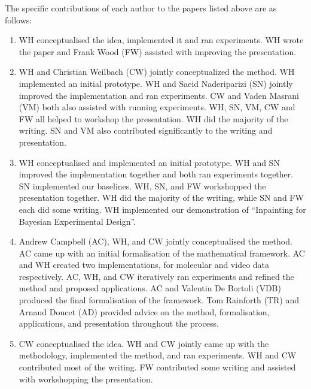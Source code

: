 
The specific contributions of each author to the papers listed above are as follows:
\begin{enumerate}
    \item WH conceptualised the idea, implemented it and ran experiments. WH wrote the paper and Frank Wood (FW) assisted with improving the presentation.
    \item WH and Christian Weilbach (CW) jointly conceptualized the method. WH implemented an initial prototype. WH and Saeid Naderiparizi (SN) jointly improved the implementation and ran experiments. CW and Vaden Masrani (VM) both also assisted with running experiments. WH, SN, VM, CW and FW all helped to workshop the presentation. WH did the majority of the writing. SN and VM also contributed significantly to the writing and presentation.
    \item WH conceptualised and implemented an initial prototype. WH and SN improved the implementation together and both ran experiments together.  SN implemented our baselines. WH, SN, and FW workshopped the presentation together. WH did the majority of the writing, while SN and FW each did some writing. WH implemented our demonstration of ``Inpainting for Bayesian Experimental Design''.
    \item Andrew Campbell (AC), WH, and CW jointly conceptualised the method. AC came up with an initial formalisation of the mathematical framework. AC and WH created two implementations, for molecular and video data respectively. AC, WH, and CW iteratively ran experiments and refined the method and proposed applications. AC and Valentin De Bortoli (VDB) produced the final formalisation of the framework. Tom Rainforth (TR) and Arnaud Doucet (AD) provided advice on the method, formalisation, applications, and presentation throughout the process.
    \item CW conceptualised the idea. WH and CW jointly came up with the methodology, implemented the method, and ran experiments. WH and CW contributed most of the writing. FW contributed some writing and assisted with workshopping the presentation.  
\end{enumerate}